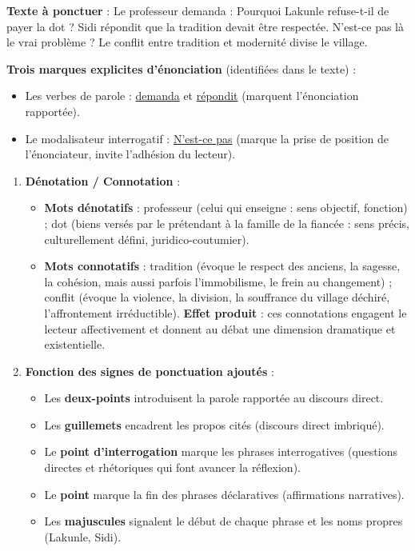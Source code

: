 \documentclass[11pt]{article}
\begin{document}
\begin{corrige}
\textbf{Texte à ponctuer} :
\og Le professeur demanda : \og Pourquoi Lakunle refuse-t-il de payer la dot ? \fg{} Sidi répondit que la tradition devait être respectée. N'est-ce pas là le vrai problème ? Le conflit entre tradition et modernité divise le village. \fg

\textbf{Trois marques explicites d'énonciation} (identifiées dans le texte) :
\begin{itemize}
\item Les verbes de parole : \og \underline{demanda} \fg{} et \og \underline{répondit} \fg (marquent l'énonciation rapportée).
\item Le modalisateur interrogatif : \og \underline{N'est-ce pas} \fg{} (marque la prise de position de l'énonciateur, invite l'adhésion du lecteur).
\end{itemize}

\begin{enumerate}
\item \textbf{Dénotation / Connotation} :
\begin{itemize}
\item \textbf{Mots dénotatifs} : \og professeur \fg{} (celui qui enseigne : sens objectif, fonction) ; \og dot \fg{} (biens versés par le prétendant à la famille de la fiancée : sens précis, culturellement défini, juridico-coutumier).
\item \textbf{Mots connotatifs} : \og tradition \fg{} (évoque le respect des anciens, la sagesse, la cohésion, mais aussi parfois l'immobilisme, le frein au changement) ; \og conflit \fg{} (évoque la violence, la division, la souffrance du village déchiré, l'affrontement irréductible). \textbf{Effet produit} : ces connotations engagent le lecteur affectivement et donnent au débat une dimension dramatique et existentielle.
\end{itemize}
\item \textbf{Fonction des signes de ponctuation ajoutés} :
\begin{itemize}
\item Les \textbf{deux-points} introduisent la parole rapportée au discours direct.
\item Les \textbf{guillemets} encadrent les propos cités (discours direct imbriqué).
\item Le \textbf{point d'interrogation} marque les phrases interrogatives (questions directes et rhétoriques qui font avancer la réflexion).
\item Le \textbf{point} marque la fin des phrases déclaratives (affirmations narratives).
\item Les \textbf{majuscules} signalent le début de chaque phrase et les noms propres (Lakunle, Sidi).
\end{itemize}
\end{enumerate}
\end{corrige}
\end{document}
